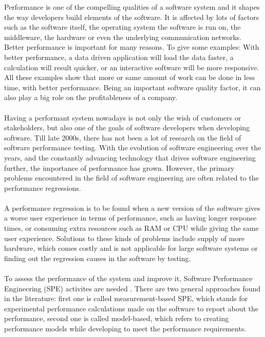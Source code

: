 \documentclass{seal_thesis}
\begin{document}
Performance is one of the compelling qualities of a software system \cite{Woodside:2007:FSP:1253532.1254717} and it shapes the way developers build elements of the software. It is affected by lots of factors such as the software itself, the operating system the software is run on, the middleware, the hardware or even the underlying communication networks\cite{Woodside:2007:FSP:1253532.1254717}. Better performance is important for many reasons. To give some examples: With better performance, a data driven application  will load the data faster, a calculation will result quicker, or an interactive software will be more responsive. All these examples show that more or same amount of work can be done in less time, with better performance. Being an important software quality factor, it can also play a big role on the profitableness of a company\cite{Nguyen:2014:ICS:2597073.2597092}.\\
\\
Having a performant system nowadays is not only the wish of customers or stakeholders, but also one of the goals of software developers when developing software. Till late 2000s, there has not been a lot of research on the field of software performance testing\cite{weyuker2000experience}. With the evolution of software engineering over the years, and the constantly advancing technology that drives software engineering further, the importance of performance has grown. However, the primary problems encountered in the field of software engineering are often related to the performance regressions\cite{weyuker2000experience}.\\
\\
A performance regression is to be found when a new version of the software gives a worse user experience in terms of performance, such as having longer response times, or consuming extra resources such as RAM or CPU while giving the same user experience\cite{Nguyen:2014:ICS:2597073.2597092}. Solutions to these kinds of problems include supply of more hardware, which comes costly and is not applicable for large software systems \cite{Nguyen:2014:ICS:2597073.2597092} or finding out the regression causes in the software by testing.\\
\\
To assess the performance of the system and improve it, Software Performance Engineering (SPE) activites are needed \cite{Woodside:2007:FSP:1253532.1254717}. There are two general approaches found in the literature: first one is called measurement-based SPE, which stands for experimental performance calculations made on the software to report about the performance, second one is called model-based, which refers to creating performance models while developing to meet the performance requirements\cite{Woodside:2007:FSP:1253532.1254717}. \\ 
\end{document}
